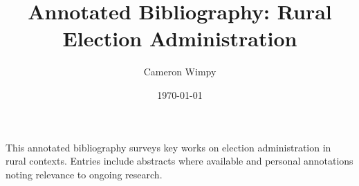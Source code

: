 \documentclass[11pt, letterpaper]{article}
\title{Annotated Bibliography: Rural Election Administration}
\author{Cameron Wimpy}
\date{\today}
\begin{document}
\maketitle

\noindent This annotated bibliography surveys key works on election
administration in rural contexts. Entries include abstracts where
available and personal annotations noting relevance to ongoing research.

\medskip

\nocite{*}

\printbibliography[title={Annotated Bibliography}]
\end{document}
